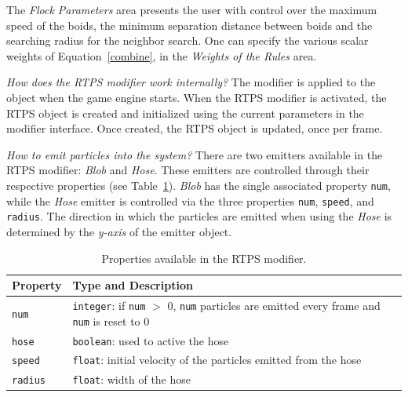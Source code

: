 The \textit{Flock Parameters} area presents the user with control over the maximum speed of the boids, the minimum separation distance between boids and the searching radius for the neighbor search. One can specify the various scalar weights of Equation~\ref{combine}, in the \textit{Weights of the Rules} area.

\textit{How does the RTPS modifier work internally?} The modifier is applied to the object when the game engine starts. When the RTPS modifier is activated, the RTPS object is created and initialized using the current parameters in the modifier interface. Once created, the RTPS object is updated, once per frame. 

\textit{How to emit particles into the system?} There are two emitters available in the RTPS modifier: \textit{Blob} and \textit{Hose}. These emitters are controlled through their respective properties (see Table~\ref{properties}). \textit{Blob} has the single associated property \texttt{num}, while the \textit{Hose} emitter is controlled via the three properties \texttt{num}, \texttt{speed}, and \texttt{radius}. The direction in which the particles are emitted when using the \textit{Hose} is determined by the \textit{y-axis} of the emitter object. 

\begin{table}[htdp]
\caption{Properties available in the RTPS modifier.}
\begin{center}
\begin{tabular}{|p{3cm}|p{9cm}|}
\hline 
\textbf{Property} & \textbf{Type and Description} \\\hline 
\texttt{num} 	& \texttt{integer}: if \texttt{num} $>$ 0, \texttt{num} particles are emitted every frame and \texttt{num} is reset to 0	\\\hline 
\texttt{hose}	& \texttt{boolean}: used to active the hose	\\\hline
\texttt{speed}	& \texttt{float}: initial velocity of the particles emitted from the hose	\\\hline
\texttt{radius}	& \texttt{float}: width of the hose	\\ %
\hline 
\end{tabular}
\end{center}
\label{properties}
\end{table}

